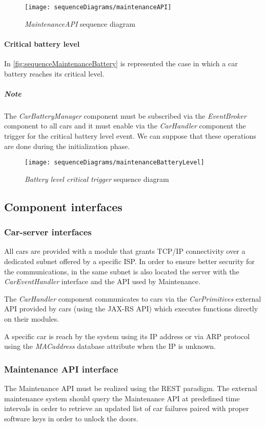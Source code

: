 \begin{figure}[h!]
	\centering
	\texttt{[image: sequenceDiagrams/maintenanceAPI]}
	\caption{
		\label{fig:sequenceMaintenanceAPI} 
		\emph{MaintenanceAPI} sequence diagram
	}
\end{figure}

\clearpage
\paragraph{Critical battery level}In \autoref{fig:sequenceMaintenanceBattery} is represented the case in which a car battery reaches its critical level.
\subparagraph{Note} The \emph{CarBatteryManager} component must be subscribed via the \mbox{\emph{EventBroker}} component to all cars and it must enable via the \emph{CarHandler} component the trigger for the critical battery level event. We can suppose that these operations are done during the initialization phase.
\begin{figure}[h!]
	\centering
	\texttt{[image: sequenceDiagrams/maintenanceBatteryLevel]}
	\caption{
		\label{fig:sequenceMaintenanceBattery} 
		\emph{Battery level critical trigger} sequence diagram
	}
\end{figure}

\clearpage
\subsection{Component interfaces}

\subsubsection{Car-server interfaces}
\label{sec:carServerInt}
All cars are provided with a module that grants TCP/IP connectivity over a dedicated subnet offered by a specific ISP. In order to ensure better security for the communications, in the same subnet is also located the server with the \mbox{\emph{CarEventHandler}} interface and the API used by Maintenance.

The \emph{CarHandler} component communicates to cars via the \mbox{\emph{CarPrimitives}} external API provided by cars (using the JAX-RS API) which executes functions directly on their modules.

A specific car is reach by the system using its IP address or via ARP protocol using the \emph{MACaddress} database attribute when the IP is unknown.

\subsubsection{Maintenance API interface}
The Maintenance API must be realized using the REST paradigm. The external maintenance system should query the Maintenance API at predefined time intervals in order to retrieve an updated list of car failures paired with proper software keys in order to unlock the doors.

